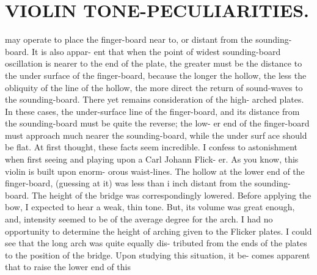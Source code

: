 \documentclass{article}
\begin{document}
\section*{VIOLIN TONE-PECULIARITIES.}
may operate to place the finger-board near to, or distant from the sounding-board. It is also appar- ent that when the point of widest sounding-board oscillation is nearer to the end of the plate, the greater must be the distance to the under surface of the finger-board, because the longer the hollow, the less the obliquity of the line of the hollow, the more direct the return of sound-waves to the sounding-board. There yet remains consideration of the high- arched plates. In these cases, the under-surface line of the finger-board, and its distance from the sounding-board must be quite the reverse; the low- er end of the finger-board must approach much nearer the sounding-board, while the under surf ace should be flat. At first thought, these facts seem incredible. I confess to astonishment when first seeing and playing upon a Carl Johann Flick- er. As you know, this violin is built upon enorm- orous waist-lines. The hollow at the lower end of the finger-board, (guessing at it) was less than i inch distant from the sounding-board. The height of the bridge was correspondingly lowered. Before applying the bow, I expected to hear a weak, thin tone. But, its volume was great enough, and, intensity seemed to be of the average degree for the arch. I had no opportunity to determine the height of arching given to the Flicker plates. I could see that the long arch was quite equally dis- tributed from the ends of the plates to the position of the bridge. Upon studying this situation, it be- comes apparent that to raise the lower end of this
\end{document}
